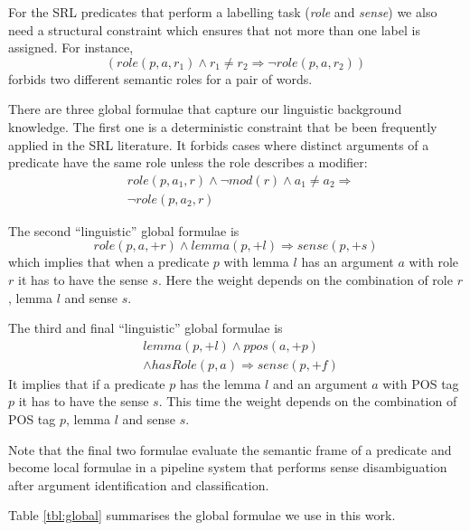 For the SRL predicates that perform a labelling task (\emph{role} and \emph{sense}) we also need a structural constraint which ensures that not more than one label is assigned. For instance,
\[
(role(p,a,r_1) \wedge r_1 \neq r_2 \Rightarrow \neg role(p,a,r_2)  )
\]
forbids two different semantic roles for a pair of words. 

There are three global formulae that capture our linguistic background knowledge. The first one is a deterministic constraint that be been frequently applied in the SRL literature. It forbids cases where distinct arguments of a predicate have the same role unless the role describes a modifier:
\begin{eqnarray*}
 &role\left(p,a_{1},r\right)\wedge \neg mod\left(r\right)\wedge a_{1}\neq a_{2}  \Rightarrow\\
  & \neg role\left(p,a_{2},r\right)
\end{eqnarray*}

The second ``linguistic'' global formulae is
\[
role(p,a,+r) \wedge lemma(p,+l) \Rightarrow sense(p,+s) 
\]
which implies that when a predicate $p$ with lemma $l$ has an argument $a$ with role $r$ it has to have the sense $s$. Here the weight depends on the combination of role $r$, lemma $l$ and sense $s$.

The third and final ``linguistic'' global formulae is
\begin{eqnarray*}
  & lemma(p,+l) \wedge ppos(a,+p)  \\
  & \wedge hasRole(p,a)  \Rightarrow sense(p,+f) 
\end{eqnarray*}
It implies that if a predicate $p$ has the lemma $l$ and an argument $a$ with POS tag $p$ it has to have the sense $s$. This time the weight depends on the combination of POS tag $p$, lemma $l$ and sense $s$.

Note that the final two formulae evaluate the semantic frame of a predicate and become local formulae in a pipeline system that performs sense disambiguation after argument identification and classification.

Table \ref{tbl:global} summarises the global formulae we use in this work. 


